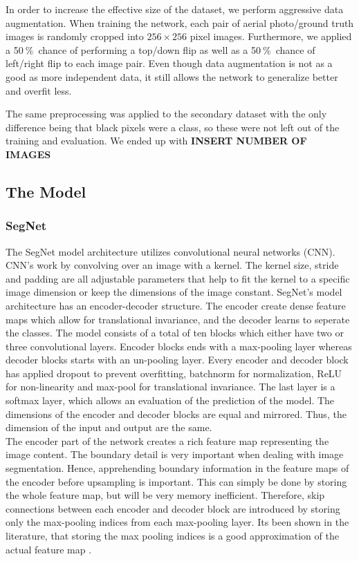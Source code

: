 \documentclass{article}
\newcommand{\pro}{\ensuremath{\ \%}}
\begin{document}
In order to increase the effective size of the dataset, we perform aggressive data augmentation.
When training the network, each pair of aerial photo/ground truth images is randomly cropped into $ 256\times 256 $ pixel images.
Furthermore, we applied a 50\pro\ chance of performing a top/down flip as well as a 50\pro\ chance of left/right flip to each image pair.
Even though data augmentation is not as a good as more independent data, it still allows the network to generalize better and overfit less.

The same preprocessing was applied to the secondary dataset with the only difference being that black pixels were a class, so these were not left out of the training and evaluation.
We ended up with \textbf{INSERT NUMBER OF IMAGES}

\subsection{The Model}

\subsubsection*{SegNet}
%
The SegNet model architecture utilizes convolutional neural networks (CNN). CNN's work by convolving over an image with a kernel. The kernel size, stride and padding are all adjustable parameters that help to fit the kernel to a specific image dimension or keep the dimensions of the image constant. 
SegNet's model architecture has an encoder-decoder structure. The encoder create dense feature maps which allow for translational invariance, and the decoder learns to seperate the classes. The model consists of a total of ten blocks which either have two or three convolutional layers. Encoder blocks ends with a max-pooling layer whereas decoder blocks starts with an un-pooling layer. Every encoder and decoder block has applied dropout to prevent overfitting, batchnorm for normalization, ReLU for non-linearity and max-pool for translational invariance. The last layer is a softmax layer, which allows an evaluation of the prediction of the model. The dimensions of the encoder and decoder blocks are equal and mirrored. Thus, the dimension of the input and output are the same. \\
 The encoder part of the network creates a rich feature map representing the image content. The boundary detail is very important when dealing with image segmentation. Hence, apprehending boundary information in the feature maps of the encoder before upsampling is important. This can simply be done by storing the whole feature map, but will be very memory inefficient. Therefore, skip connections between each encoder and decoder block are introduced by storing only the max-pooling indices from each max-pooling layer. Its been shown in the literature, that storing the max pooling indices is a good approximation of the actual feature map \cite{seg}. 
\end{document}
